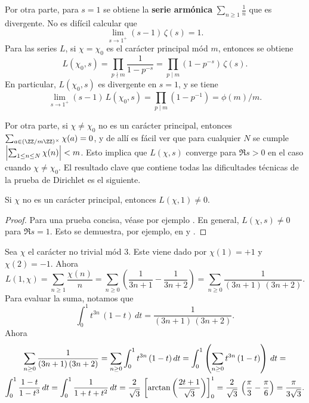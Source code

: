 Por otra parte, para $s = 1$ se obtiene la \textbf{serie armónica}
$\sum_{n\ge 1} \frac{1}{n}$ que es divergente. No es difícil calcular que
\begin{equation}
  \label{eq:residuo-de-zeta-en-1}
  \lim_{s\to 1^+} (s-1) \, \zeta (s) = 1.
\end{equation}
Para las series $L$, si $\chi = \chi_0$ es el carácter principal mód $m$,
entonces se obtiene
\[ L (\chi_0, s) = \prod_{p \nmid m} \frac{1}{1 - p^{-s}}
   = \prod_{p \mid m} (1 - p^{-s}) \, \zeta (s). \]
En particular, $L (\chi_0, s)$ es divergente en $s = 1$, y se tiene
\[ \lim_{s\to 1^+} (s-1)\,L (\chi_0, s) = \prod_{p \mid m} (1 - p^{-1})
   = \phi (m)/m. \]

Por otra parte, si $\chi \ne \chi_0$ no es un carácter principal, entonces
$\sum_{a \in (\ZZ/m\ZZ)^\times} \chi (a) = 0$, y de allí es fácil ver que
para cualquier $N$ se cumple $\Bigl|\sum_{1 \le n \le N} \chi (n)\Bigr| < m$.
Esto implica que $L (\chi,s)$ converge para $\Re s > 0$ en el caso cuando $\chi
\ne \chi_0$. El resultado clave que contiene todas las dificultades técnicas de
la prueba de Dirichlet es el siguiente.

\begin{teorema}
  \label{thm:L(chi,1)}
  Si $\chi$ no es un carácter principal, entonces $L (\chi,1) \ne 0$.

  \begin{proof}
    Para una prueba concisa, véase por ejemplo \cite[\S 16.5]{Ireland-Rosen}.
    En general, $L (\chi,s) \ne 0$ para $\Re s = 1$. Esto se demuestra, por
    ejemplo, en \cite[Chapter~5]{Everiste-ANT} y
    \cite[Chapter~6]{Hlawka-Taschner-Schoissengeier}.
  \end{proof}
\end{teorema}

\begin{ejemplo}
  Sea $\chi$ el carácter no trivial mód $3$. Este viene dado por
  $\chi (1) = +1$ y $\chi (2) = -1$. Ahora
  $$L (1,\chi) = \sum_{n \ge 1} \frac{\chi (n)}{n} = \sum_{n \ge 0} \left(\frac{1}{3n + 1} - \frac{1}{3n+2}\right) = \sum_{n \ge 0} \frac{1}{(3n+1)\,(3n+2)}.$$
  Para evaluar la suma, notamos que
  $$\int_0^1 t^{3n} \, (1-t) \, dt = \frac{1}{(3n+1)\,(3n+2)}.$$
  Ahora
  \begin{multline*}
    \sum_{n \ge 0} \frac{1}{(3n+1)\,(3n+2)} = \sum_{n \ge 0} \int_0^1 t^{3n} \, (1-t) \, dt = \int_0^1 \left(\sum_{n \ge 0} t^{3n} \, (1-t)\right) \, dt =\\
    \int_0^1 \frac{1-t}{1-t^3}\,dt = \int_0^1 \frac{1}{1 + t + t^2}\,dt = \frac{2}{\sqrt{3}}\,\left[\arctan \left(\frac{2t+1}{\sqrt{3}}\right)\right]_0^1 = \frac{2}{\sqrt{3}}\,\left(\frac{\pi}{3} - \frac{\pi}{6}\right) = \frac{\pi}{3\sqrt{3}}. \qedhere
  \end{multline*}
\end{ejemplo}

